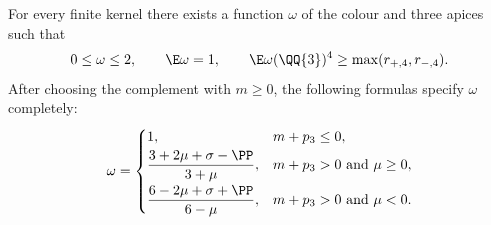 \begin{theorem}
\label{thm:weighted-reference}
\proved For every finite kernel there exists a function $\omega$ of the colour and three
apices such that
\[
 0\le\omega\le2,\qquad\E\omega=1,\qquad
 \E\omega(\QQ{3})^4\ge\max(r_{+,4},r_{-,4}).
\]
After choosing the complement with $m\ge0$, the following formulas specify $\omega$
completely:
\[
 \omega=
 \begin{cases}
 1,&m+p_3\le0,\\[2pt]
 \displaystyle\frac{3+2\mu+\sigma-\PP}{3+\mu},
      &m+p_3>0\text{ and }\mu\ge0,\\[7pt]
 \displaystyle\frac{6-2\mu+\sigma+\PP}{6-\mu},
      &m+p_3>0\text{ and }\mu<0.
 \end{cases}
\]
\end{theorem}
